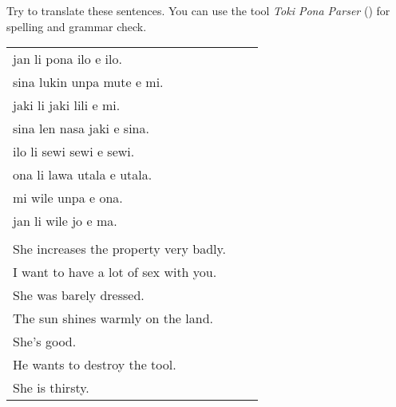 Try to translate these sentences. 
You can use the tool \textit{Toki Pona Parser} (\cite{www:rowa:02}) for spelling and grammar check. 

\begin{supertabular}{p{5,5cm}|ll}
jan li pona ilo e ilo. &&   \\ %
sina lukin unpa mute e mi. &&    \\ %
jaki li jaki lili e mi. &&   \\ %
sina len nasa jaki e sina. &&   \\ %
ilo li sewi sewi e sewi. &&   \\ %
ona li lawa utala e utala. &&   \\ %
mi wile unpa e ona. &&   \\ %
jan li wile jo e ma. &&  \\ %
 && \\ %
She increases the property very badly. &&   \\
I want to have a lot of sex with you. &&   \\
She was barely dressed. &&   \\
The sun shines warmly on the land. &&   \\
She's good. &&  \\
He wants to destroy the tool. &&  \\ %
She is thirsty. && \\ %
\end{supertabular} 


